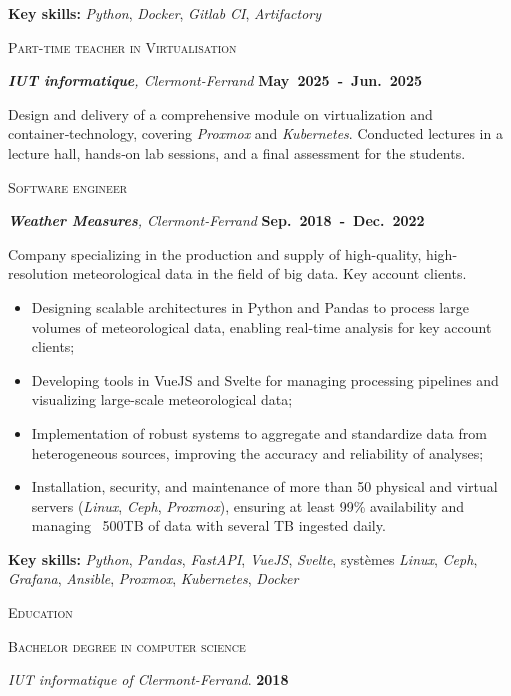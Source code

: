 \documentclass[10pt, a4paper]{article}
\newcommand{\dates}[1]{\hfill\mbox{\textbf{#1}}}
\newcommand{\headright}[1]{\vspace*{2.5ex}\textsc{\Large\color{accent}#1}\par%
     \vspace*{-2ex}{\color{accent}\hrulefill}\par}
\begin{document}
\begin{minipage}[t]{0.56\textwidth}
{\textbf{Key skills:} \emph{Python}, \emph{Docker}, \emph{Gitlab CI}, \emph{Artifactory}
}


\medskip

\textsc{Part-time teacher in Virtualisation} 

\textit{\textbf{IUT informatique}, Clermont-Ferrand}  \dates{May 2025 - Jun. 2025}

{\small
Design and delivery of a comprehensive module on virtualization and container‑technology, covering \emph{Proxmox} and \emph{Kubernetes}. Conducted lectures in a lecture hall, hands‑on lab sessions, and a final assessment for the students.
}

\medskip

\textsc{Software engineer}

\textit{\textbf{Weather Measures}, Clermont-Ferrand}  \dates{Sep. 2018 - Dec. 2022}

{\small
Company specializing in the production and supply of high-quality, high-resolution meteorological data in the field of big data. Key account clients.

\begin{itemize}
    \item Designing scalable architectures in Python and Pandas to process large volumes of meteorological data, enabling real-time analysis for key account clients;
    \item Developing tools in VueJS and Svelte for managing processing pipelines and visualizing large-scale meteorological data;
    \item Implementation of robust systems to aggregate and standardize data from heterogeneous sources, improving the accuracy and reliability of analyses;
    \item Installation, security, and maintenance of more than 50 physical and virtual servers (\emph{Linux}, \emph{Ceph}, \emph{Proxmox}), ensuring at least 99\% availability and managing ~500TB of data with several TB ingested daily.
\end{itemize}

\textbf{Key skills:} \emph{Python}, \emph{Pandas}, \emph{FastAPI}, \emph{VueJS}, \emph{Svelte}, systèmes \emph{Linux}, \emph{Ceph}, \emph{Grafana}, \emph{Ansible}, \emph{Proxmox}, \emph{Kubernetes}, \emph{Docker}
}

\headright{Education}

\textsc{Bachelor degree in computer science}

\textit{IUT informatique of Clermont-Ferrand}. \dates{2018}

\end{minipage}
\end{document}
